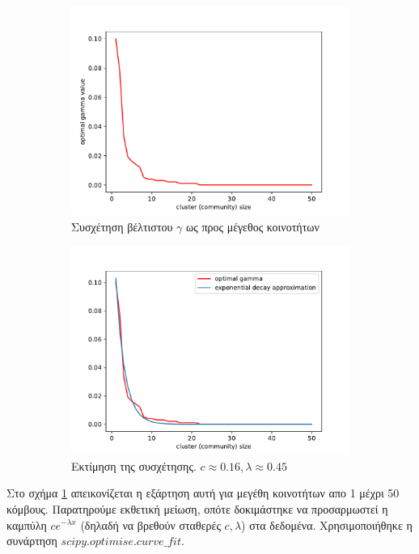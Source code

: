 \documentclass[12pt, letterpaper]{article}
\begin{document}
\begin{figure}
  \begin{subfigure}{0.5\textwidth}
    \centering
    \includegraphics[width=0.9\linewidth]{gamma_wrt_cluster_nodes.pdf}
    \caption{Συσχέτηση βέλτιστου $\gamma$ ως προς μέγεθος κοινοτήτων}
    \label{optimal_gamma}
  \end{subfigure}
  \begin{subfigure}{0.5\textwidth}
    \centering
    \includegraphics[width=0.9\linewidth]{gammas_approximation.pdf}
    \caption{Εκτίμηση της συσχέτησης. $c \approx 0.16, \lambda \approx 0.45$}
    \label{optimal_gamma_approx}
  \end{subfigure}

  \caption{}
  \label{}
\end{figure}

Στο σχήμα \ref{optimal_gamma} απεικονίζεται η εξάρτηση αυτή για μεγέθη κοινοτήτων 
απο 1 μέχρι 50 κόμβους. Παρατηρούμε εκθετική μείωση, οπότε δοκιμάστηκε να προσαρμωστεί 
η καμπύλη $c e^{- \lambda x}$ (δηλαδή να βρεθούν σταθερές $c, \lambda$) στα δεδομένα.
Χρησιμοποιήθηκε η συνάρτηση $scipy.optimise.curve\_fit$.
\end{document}
